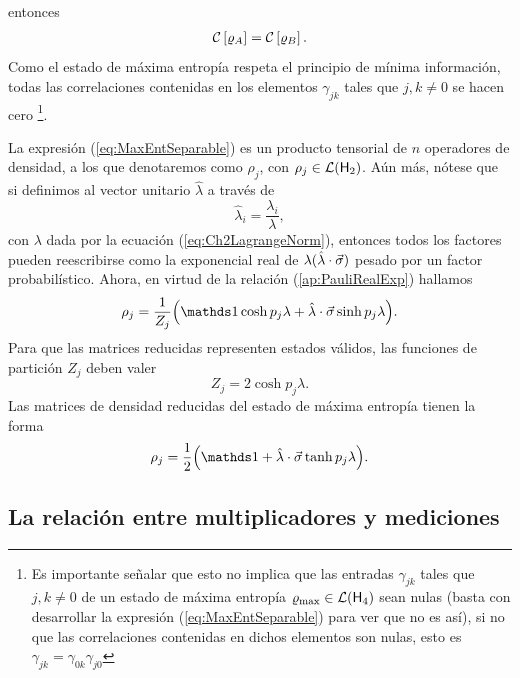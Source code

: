 entonces
\begin{align}
    \mathcal{C}\left[\varrho_{A}\right]=\mathcal{C}\left[\varrho_{B}\right].\nonumber
\end{align}
Como el estado de máxima entropía respeta el principio de mínima información, todas las correlaciones contenidas en los elementos $\gamma_{jk}$ tales que $j,k\neq 0$ se hacen cero \footnote{Es importante señalar que esto no implica que las entradas $\gamma_{jk}$ tales que $j,k\neq 0$ de un estado de máxima entropía $\varrho_{\max}\in\mathcal{L}({\sf H}_{4})$ sean nulas (basta con desarrollar la expresión (\ref{eq:MaxEntSeparable}) para ver que no es así), si no que las correlaciones contenidas en dichos elementos son nulas, esto es $\gamma_{jk}=\gamma_{0k}\gamma_{j0}$}. 



La expresión (\ref{eq:MaxEntSeparable}) es un producto tensorial de $n$ operadores de densidad, a los que denotaremos como $\rho_{j}$, con $\rho_{j}\in\mathcal{L}({\sf H}_{2})$. Aún más, nótese que si definimos al vector unitario $\hat{\lambda}$ a través de
\begin{equation}
    \hat{\lambda}_{i}=\frac{\lambda_{i}}{\lambda},\nonumber
\end{equation}
con $\lambda$ dada por la ecuación (\ref{eq:Ch2LagrangeNorm}), entonces todos los factores pueden reescribirse como la exponencial real de $\lambda(\hat{\lambda}\cdot\vec{\sigma})$ pesado por un factor probabilístico. Ahora, en virtud de la relación (\ref{ap:PauliRealExp}) hallamos
\begin{equation}
    \rho_{j}=\frac{1}{Z_{j}}\qty(\Id\cosh{p_{j}\lambda}+\paulivec{\lambda}\sinh{p_{j}\lambda}).\nonumber
\end{equation}
Para que las matrices reducidas representen estados válidos, las funciones de partición $Z_{j}$ deben valer
\begin{equation}
    Z_{j}=2\cosh{p_{j}\lambda}.\nonumber
\end{equation}
Las matrices de densidad reducidas del estado de máxima entropía tienen la forma
\begin{equation}\label{eq:rhoArhoB}
    \rho_{j}=\frac{1}{2}\qty(\Id+\paulivec{\lambda}\tanh{p_{j}\lambda}).
\end{equation}

\subsection{La relación entre multiplicadores y mediciones}

